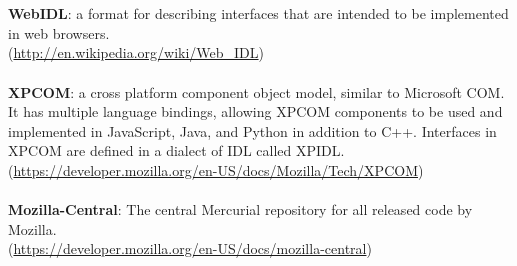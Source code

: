 \documentclass[12pt]{article}
\begin{document}
\\\\
\textbf{WebIDL}: a format for describing interfaces that are intended to be implemented in web browsers.\\(\href{http://en.wikipedia.org/wiki/Web_IDL}{http://en.wikipedia.org/wiki/Web\_IDL})
\\\\
\textbf{XPCOM}: a cross platform component object model, similar to Microsoft COM. It has multiple language bindings, allowing XPCOM components to be used and implemented in JavaScript, Java, and Python in addition to C++. Interfaces in XPCOM are defined in a dialect of IDL called XPIDL.\\(\href{https://developer.mozilla.org/en-US/docs/Mozilla/Tech/XPCOM}{https://developer.mozilla.org/en-US/docs/Mozilla/Tech/XPCOM})
\\\\
\textbf{Mozilla-Central}: The central Mercurial repository for all released code by Mozilla.\\(\href{https://developer.mozilla.org/en-US/docs/mozilla-central}{https://developer.mozilla.org/en-US/docs/mozilla-central})
\end{document}
